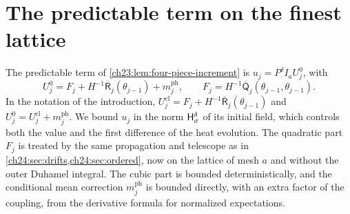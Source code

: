 \section{The predictable term on the finest lattice}\label{ch24:sec:predictable}

The predictable term of \cref{ch23:lem:four-piece-increment} is $u_j=P_\cdot^\delta I_aU_j^0$, with
\[
 U_j^0=F_j+H^{-1}\overline{\mathsf R}_j(\theta_{j-1})+m_j^{\mathrm{ph}},\qquad F_j=H^{-1}\overline{\mathsf Q}_j(\theta_{j-1},\theta_{j-1}).
\]
In the notation of the introduction, $U_j^{\mathrm{cl}}=F_j+H^{-1}\overline{\mathsf R}_j(\theta_{j-1})$ and $U_j^0=U_j^{\mathrm{cl}}+m_j^{\mathrm{ph}}$. We bound $u_j$ in the norm $\mathsf H_{\sigma}^{\delta}$ of its initial field, which controls both the value and the first difference of the heat evolution. The quadratic part $F_j$ is treated by the same propagation and telescope as in \cref{ch24:sec:drifts,ch24:sec:ordered}, now on the lattice of mesh $a$ and without the outer Duhamel integral. The cubic part is bounded deterministically, and the conditional mean correction $m_j^{\mathrm{ph}}$ is bounded directly, with an extra factor of the coupling, from the derivative formula for normalized expectations.

